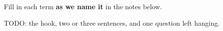 \documentclass[10pt]{article}
\begin{document}

\vspace{2pt}

\boxguard[16]
\begin{vocabbox}
\small
Fill in each term \textbf{as we name it} in the notes below.
\par
{}
\par
{}
\par
{}
\par
\end{vocabbox}

\boxguard[14]
\begin{hookbox}
\small
TODO: the hook, two or three sentences, and one question left hanging.
\par{}
\end{hookbox}
\end{document}
